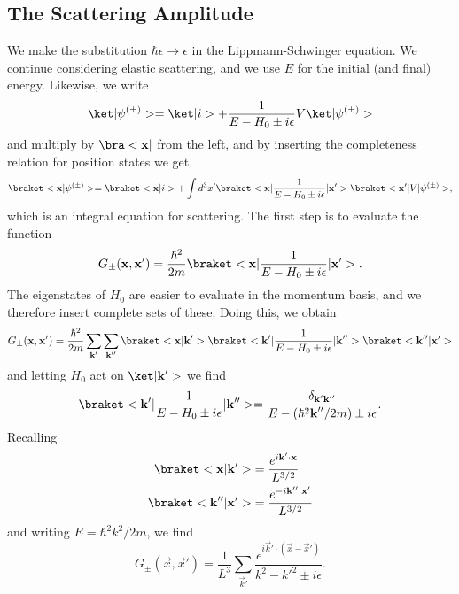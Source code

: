 \subsection{The Scattering Amplitude}
We make the substitution $\hbar \epsilon \to \epsilon$ in the Lippmann-Schwinger equation. We continue considering elastic scattering, and we use $E$ for the initial (and final) energy. Likewise, we write
\begin{equation}
    \k{\psi^{(\pm)}} = \k{i} + \frac{1}{E-H_0 \pm i\epsilon} V\k{\psi^{(\pm)}}
\end{equation}
and multiply by $\b{\vec{x}}$ from the left, and by inserting the completeness relation for position states we get
\begin{equation}
    \bk{\vec{x}}{\psi^{(\pm)} } = \bk{\vec{x}}{i} + \int d^3 x' \bkop{\vec{x}}{\frac{1}{E - H_0 \pm i\epsilon}}{\vec{x}'}\bkop{\vec{x}'}{V}{\psi^{(\pm)} },
\end{equation}
which is an integral equation for scattering. The first step is to evaluate the function
\begin{equation}
    G_\pm (\vec{x},\vec{x}') = \frac{\hbar^2}{2m} \bkop{\vec{x}}{\frac{1}{E - H_0 \pm i \epsilon}}{\vec{x}'}.
\end{equation}
The eigenstates of $H_0$ are easier to evaluate in the momentum basis, and we therefore insert complete sets of these. Doing this, we obtain
\begin{equation}
    G_\pm (\vec{x},\vec{x}') = \frac{\hbar^2}{2m} \sum_{\vec{k}'}\sum_{\vec{k}''} \bk{\vec{x}}{\vec{k}'} \bkop{\vec{k}'}{\frac{1}{E-H_0\pm i\epsilon}}{\vec{k}''} \bk{\vec{k}''}{\vec{x}'}
\end{equation}
and letting $H_0$ act on $\k{\vec{k}'}$ we find
\begin{equation}
    \bkop{\vec{k}'}{\frac{1}{E-H_0\pm i\epsilon}}{\vec{k}''} =  \frac{\delta_{\vec{k}'\vec{k}''}}{E - (\hbar^2 \vec{k}'' / 2m) \pm i\epsilon}.
\end{equation}
Recalling
\begin{align}
    \bk{\vec{x}}{\vec{k}'} &= \frac{e^{i\vec{k}'\cdot \vec{x}}}{L^{3/2}}\\
    \bk{\vec{k}''}{\vec{x}'} &= \frac{e^{-i\vec{k}''\cdot \vec{x}'}}{L^{3/2}}
\end{align}
and writing $E = \hbar^2 k^2 / 2m$, we find 
\begin{equation}
    G_\pm (\vec{x}, \vec{x}') = \frac{1}{L^3} \sum_{\vec{k}'} \frac{e^{i\vec{k}'\cdot(\vec{x}-\vec{x}')}}{k^2 - k'^2 \pm i\epsilon}.
\end{equation}
